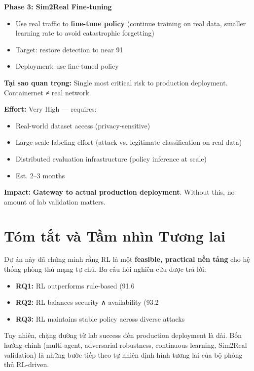 \documentclass[12pt,a4paper,twoside]{report}
\begin{document}
{{{{{{{{{{{{{{\textbf{Phase 3: Sim2Real Fine-tuning}
\begin{itemize}
\item Use real traffic to \textbf{fine-tune policy} (continue training on real data, smaller learning rate to avoid catastrophic forgetting)
\item Target: restore detection to near 91%
\item Deployment: use fine-tuned policy
\end{itemize}

\textbf{Tại sao quan trọng:} Single most critical risk to production deployment. Containernet ≠ real network.

\textbf{Effort:} Very High — requires:
\begin{itemize}
\item Real-world dataset access (privacy-sensitive)
\item Large-scale labeling effort (attack vs. legitimate classification on real data)
\item Distributed evaluation infrastructure (policy inference at scale)
\item Est. 2–3 months
\end{itemize}

\textbf{Impact:} \textbf{Gateway to actual production deployment}. Without this, no amount of lab validation matters.


\section{Tóm tắt và Tầm nhìn Tương lai}

Dự án này đã chứng minh rằng RL là một \textbf{feasible, practical nền tảng} cho hệ thống phòng thủ mạng tự chủ. Ba câu hỏi nghiên cứu được trả lời:
\begin{itemize}
\item \textbf{RQ1:} RL outperforms rule-based (91.6%
\item \textbf{RQ2:} RL balances security ∧ availability (93.2%
\item \textbf{RQ3:} RL maintains stable policy across diverse attacks
\end{itemize}

Tuy nhiên, chặng đường từ lab success đến production deployment là dài. Bốn hướng chính (multi-agent, adversarial robustness, continuous learning, Sim2Real validation) là những bước tiếp theo tự nhiên định hình tương lai của bộ phòng thủ RL-driven.

}}}}}}}}}}}}}}
\end{document}
